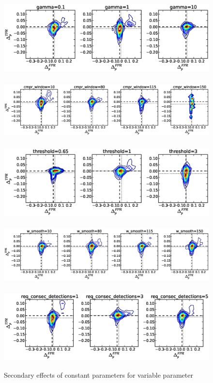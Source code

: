 \begin{figure}[!h]
\begin{center}
\includegraphics[height=1.5in]{../fig/final/delta_hist_sec/detection_window_hrs/gamma}
\includegraphics[height=1.5in]{../fig/final/delta_hist_sec/detection_window_hrs/cmpr_window}
\includegraphics[height=1.5in]{../fig/final/delta_hist_sec/detection_window_hrs/threshold}
\includegraphics[height=1.5in]{../fig/final/delta_hist_sec/detection_window_hrs/w_smooth}
\includegraphics[height=1.5in]{../fig/final/delta_hist_sec/detection_window_hrs/req_consec_detections}
\end{center}
\caption{\label{fig:delta_sec5} Secondary effects of constant parameters for variable parameter }
\end{figure}

